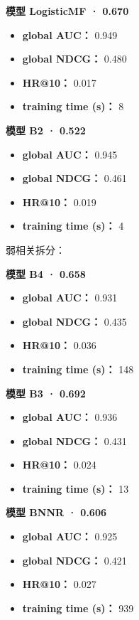 \documentclass[
  10pt,
]{ctexart}
\providecommand{\tightlist}{%
  \setlength{\itemsep}{0pt}\setlength{\parskip}{0pt}}
\begin{document}
\textbf{模型 LogisticMF · 0.670}

\begin{itemize}
\tightlist
\item
  \textbf{global AUC：} 0.949
\item
  \textbf{global NDCG：} 0.480
\item
  \textbf{HR@10：} 0.017
\item
  \textbf{training time (s)：} 8
\end{itemize}

\textbf{模型 B2 · 0.522}

\begin{itemize}
\tightlist
\item
  \textbf{global AUC：} 0.945
\item
  \textbf{global NDCG：} 0.461
\item
  \textbf{HR@10：} 0.019
\item
  \textbf{training time (s)：} 4
\end{itemize}

弱相关拆分：

\textbf{模型 B4 · 0.658}

\begin{itemize}
\tightlist
\item
  \textbf{global AUC：} 0.931
\item
  \textbf{global NDCG：} 0.435
\item
  \textbf{HR@10：} 0.036
\item
  \textbf{training time (s)：} 148
\end{itemize}

\textbf{模型 B3 · 0.692}

\begin{itemize}
\tightlist
\item
  \textbf{global AUC：} 0.936
\item
  \textbf{global NDCG：} 0.431
\item
  \textbf{HR@10：} 0.024
\item
  \textbf{training time (s)：} 13
\end{itemize}

\textbf{模型 BNNR · 0.606}

\begin{itemize}
\tightlist
\item
  \textbf{global AUC：} 0.925
\item
  \textbf{global NDCG：} 0.421
\item
  \textbf{HR@10：} 0.027
\item
  \textbf{training time (s)：} 939
\end{itemize}
\end{document}
